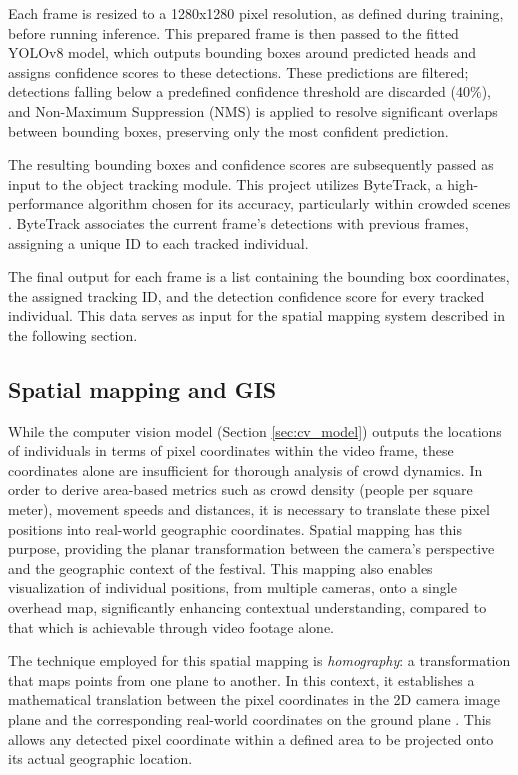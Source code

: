 Each frame is resized to a 1280x1280 pixel resolution, as defined during training, before running inference. This prepared frame is then passed to the fitted YOLOv8 model, which outputs bounding boxes around predicted heads and assigns confidence scores to these detections. These predictions are filtered; detections falling below a predefined confidence threshold are discarded (40\%), and Non-Maximum Suppression (NMS) is applied to resolve significant overlaps between bounding boxes, preserving only the most confident prediction.

The resulting bounding boxes and confidence scores are subsequently passed as input to the object tracking module. This project utilizes ByteTrack, a high-performance algorithm chosen for its accuracy, particularly within crowded scenes \cite{bytetrack}. ByteTrack associates the current frame's detections with previous frames, assigning a unique ID to each tracked individual.

The final output for each frame is a list containing the bounding box coordinates, the assigned tracking ID, and the detection confidence score for every tracked individual. This data serves as input for the spatial mapping system described in the following section.

\subsection{Spatial mapping and GIS}
\label{sec:spatial_mapping}

While the computer vision model (Section \ref{sec:cv_model}) outputs the locations of individuals in terms of pixel coordinates within the video frame, these coordinates alone are insufficient for thorough analysis of crowd dynamics. In order to derive area-based metrics such as crowd density (people per square meter), movement speeds and distances, it is necessary to translate these pixel positions into real-world geographic coordinates. Spatial mapping has this purpose, providing the planar transformation between the camera's perspective and the geographic context of the festival. This mapping also enables visualization of individual positions, from multiple cameras, onto a single overhead map, significantly enhancing contextual understanding, compared to that which is achievable through video footage alone.

The technique employed for this spatial mapping is \textit{homography}: a transformation that maps points from one plane to another. In this context, it establishes a mathematical translation between the pixel coordinates in the 2D camera image plane and the corresponding real-world coordinates on the ground plane \cite{homography}. This allows any detected pixel coordinate within a defined area to be projected onto its actual geographic location.

